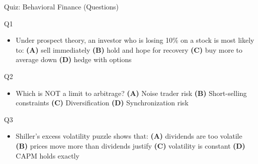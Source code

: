 \documentclass[9pt, aspectratio=169, t]{beamer}
\theoremstyle{definition}
\newenvironment{cminipage}[1]{%
    \par\noindent\hfill\begin{minipage}{#1}\ignorespaces
}{%
    \end{minipage}\hfill\null\par
}
\begin{document}
\begin{frame}{Quiz: Behavioral Finance (Questions)}
\begin{cminipage}{0.95\textwidth}
\small
\begin{alertblock}{Q1}
\begin{itemize}\setlength{\itemsep}{0pt}
    \item Under prospect theory, an investor who is losing 10\% on a stock is most likely to: \textbf{(A)} sell immediately \textbf{(B)} hold and hope for recovery \textbf{(C)} buy more to average down \textbf{(D)} hedge with options
\end{itemize}
\end{alertblock}

\begin{alertblock}{Q2}
\begin{itemize}\setlength{\itemsep}{0pt}
    \item Which is NOT a limit to arbitrage? \textbf{(A)} Noise trader risk \textbf{(B)} Short-selling constraints \textbf{(C)} Diversification \textbf{(D)} Synchronization risk
\end{itemize}
\end{alertblock}

\begin{alertblock}{Q3}
\begin{itemize}\setlength{\itemsep}{0pt}
    \item Shiller's excess volatility puzzle shows that: \textbf{(A)} dividends are too volatile \textbf{(B)} prices move more than dividends justify \textbf{(C)} volatility is constant \textbf{(D)} CAPM holds exactly
\end{itemize}
\end{alertblock}
\end{cminipage}
\end{frame}
\end{document}
